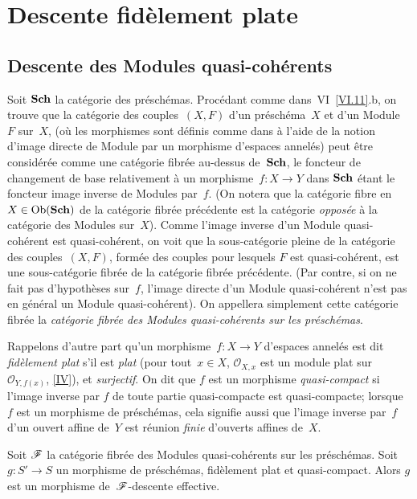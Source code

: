 \chapter{Descente fid\`element plate}
\label{VIII}

\section{Descente des Modules quasi-coh\'erents}
\label{VIII.1}

Soit $\mathbf{Sch}$
\label{indnot:hb}la cat\'egorie des pr\'esch\'emas. Proc\'edant comme
dans~VI~\ref{VI.11}.b, on trouve que la cat\'egorie des
couples~$(X,F)$ d'un pr\'esch\'ema~$X$ et d'un Module~$F$ sur~$X$,
(o\`u les morphismes sont d\'efinis comme dans \loccit \`a
l'aide de la notion d'image directe de Module par un morphisme
d'espaces annel\'es) peut \^etre consid\'er\'ee comme une
cat\'egorie fibr\'ee au-dessus de~$\mathbf{Sch}$, le foncteur de
changement de base relativement \`a un morphisme~$f\colon X\to Y$
dans $\mathbf{Sch}$ \'etant le foncteur image inverse de Modules
par~$f$. (On notera que la cat\'egorie fibre en~$X\in \operatorname{\mathrm{Ob}}(\mathbf{Sch})$ de
la cat\'egorie fibr\'ee pr\'ec\'edente est la cat\'egorie
\emph{opposée} \`a la cat\'egorie des Modules sur~$X$). Comme
l'image inverse d'un Module quasi-coh\'erent est quasi-coh\'erent,
on voit que la sous-cat\'egorie pleine de la cat\'egorie des
couples~$(X,F)$, form\'ee des couples pour lesquels $F$ est
quasi-coh\'erent, est une sous-cat\'egorie fibr\'ee de la
cat\'egorie fibr\'ee pr\'ec\'edente. (Par contre, si on ne
fait pas d'hypoth\`eses sur~$f$, l'image directe d'un Module
quasi-coh\'erent n'est pas en g\'en\'eral un Module
quasi-coh\'erent). On appellera simplement cette cat\'egorie
fibr\'ee la \emph{catégorie fibrée des Modules
quasi-cohérents sur les préschémas}.

Rappelons d'autre part qu'un morphisme~$f\colon X\to Y$ d'espaces
annel\'es est dit \emph{fidèlement plat}
s'il est \emph{plat} (\ie pour tout~$x\in X$, $\mathcal{O}_{X,x}$ est
un module plat sur~$\mathcal{O}_{Y,f(x)}$, \eqref{IV}), et
\emph{surjectif}. On dit que $f$ est un morphisme \emph{quasi-compact}
si l'image inverse par $f$ de toute partie quasi-compacte est
quasi-compacte; lorsque $f$ est un morphisme de pr\'esch\'emas,
cela signifie aussi que l'image inverse par~$f$ d'un ouvert affine
de~$Y$ est r\'eunion \emph{finie} d'ouverts affines de~$X$.

\begin{theoreme}
\label{VIII.1.1}
Soit
$\cal{F}$ la cat\'egorie fibr\'ee des Modules
quasi-coh\'erents sur les pr\'esch\'emas. Soit
$g\colon S'\to S$
un morphisme de pr\'esch\'emas, fid\`element plat et
quasi-compact. Alors $g$ est un morphisme de~$\cal{F}$-descente
effective.
\end{theoreme}

